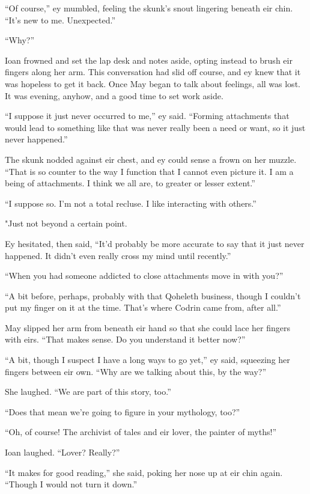 ``Of course,'' ey mumbled, feeling the skunk's snout lingering beneath eir chin. ``It's new to me. Unexpected.''

``Why?''

Ioan frowned and set the lap desk and notes aside, opting instead to brush eir fingers along her arm. This conversation had slid off course, and ey knew that it was hopeless to get it back. Once May began to talk about feelings, all was lost. It was evening, anyhow, and a good time to set work aside.

``I suppose it just never occurred to me,'' ey said. ``Forming attachments that would lead to something like that was never really been a need or want, so it just never happened.''

The skunk nodded against eir chest, and ey could sense a frown on her muzzle. ``That is so counter to the way I function that I cannot even picture it. I am a being of attachments. I think we all are, to greater or lesser extent.''

``I suppose so. I'm not a total recluse. I like interacting with others.''

"Just not beyond a certain point.

Ey hesitated, then said, ``It'd probably be more accurate to say that it just never happened. It didn't even really cross my mind until recently.''

``When you had someone addicted to close attachments move in with you?''

``A bit before, perhaps, probably with that Qoheleth business, though I couldn't put my finger on it at the time. That's where Codrin came from, after all.''

May slipped her arm from beneath eir hand so that she could lace her fingers with eirs. ``That makes sense. Do you understand it better now?''

``A bit, though I suspect I have a long ways to go yet,'' ey said, squeezing her fingers between eir own. ``Why are we talking about this, by the way?''

She laughed. ``We are part of this story, too.''

``Does that mean we're going to figure in your mythology, too?''

``Oh, of course! The archivist of tales and eir lover, the painter of myths!''

Ioan laughed. ``Lover? Really?''

``It makes for good reading,'' she said, poking her nose up at eir chin again. ``Though I would not turn it down.''

